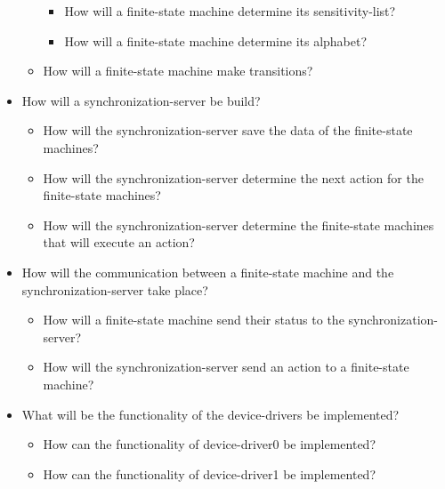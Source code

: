 \begin{itemize}
\begin{itemize}
    \begin{itemize}
    \tightlist
    \item
      How will a finite-state machine determine its sensitivity-list?
    \item
      How will a finite-state machine determine its alphabet?
    \end{itemize}
  \item
    How will a finite-state machine make transitions?
  \end{itemize}
\item
  How will a synchronization-server be build?

  \begin{itemize}
  \tightlist
  \item
    How will the synchronization-server save the data of the
    finite-state machines?
  \item
    How will the synchronization-server determine the next action for
    the finite-state machines?
  \item
    How will the synchronization-server determine the finite-state
    machines that will execute an action?
  \end{itemize}
\item
  How will the communication between a finite-state machine and the
  synchronization-server take place?

  \begin{itemize}
  \tightlist
  \item
    How will a finite-state machine send their status to the
    synchronization-server?
  \item
    How will the synchronization-server send an action to a finite-state
    machine?
  \end{itemize}
\item
  What will be the functionality of the device-drivers be implemented?

  \begin{itemize}
  \tightlist
  \item
    How can the functionality of device-driver0 be implemented?
  \item
    How can the functionality of device-driver1 be implemented?
  \end{itemize}
\end{itemize}
